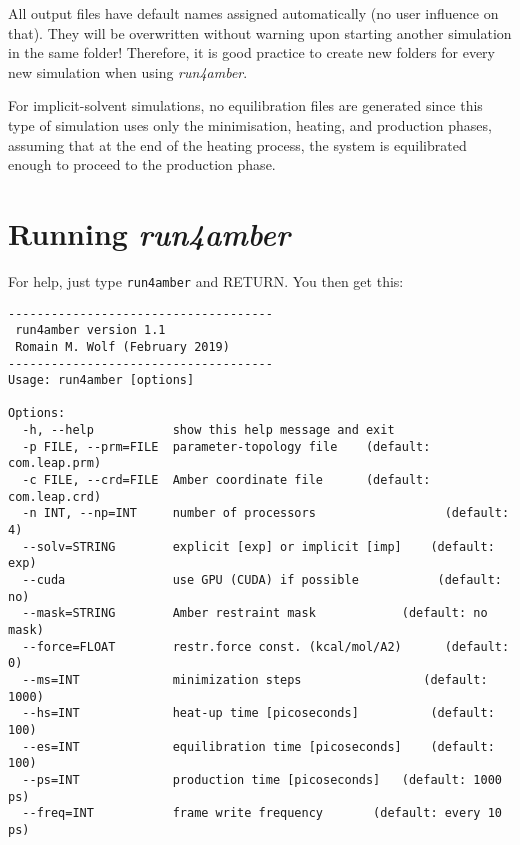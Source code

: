 \documentclass[10pt,landscape,twocolumn]{article}
\begin{document}
\begin{mdframed}All output files have default names assigned automatically (no user influence on that). They will be overwritten without warning upon starting another simulation in the same folder! Therefore, it is good practice to create new folders for every new simulation when using \textsl{run4amber}.\end{mdframed}

\small For implicit-solvent simulations, no equilibration files are generated since this type of simulation uses only the minimisation, heating, and production phases, assuming that at the end of the heating process, the system is equilibrated enough to proceed to the production phase.\normalsize 

\newpage

\section{Running \textsl{run4amber}}

For help, just type \texttt{run4amber} and RETURN. You then get this:

\begin{verbatim}
-------------------------------------
 run4amber version 1.1
 Romain M. Wolf (February 2019)
-------------------------------------
Usage: run4amber [options]

Options:
  -h, --help           show this help message and exit
  -p FILE, --prm=FILE  parameter-topology file    (default: com.leap.prm)
  -c FILE, --crd=FILE  Amber coordinate file      (default: com.leap.crd)
  -n INT, --np=INT     number of processors                  (default: 4)
  --solv=STRING        explicit [exp] or implicit [imp]    (default: exp)
  --cuda               use GPU (CUDA) if possible           (default: no)
  --mask=STRING        Amber restraint mask            (default: no mask)
  --force=FLOAT        restr.force const. (kcal/mol/A2)      (default: 0)
  --ms=INT             minimization steps                 (default: 1000)
  --hs=INT             heat-up time [picoseconds]          (default: 100)
  --es=INT             equilibration time [picoseconds]    (default: 100)
  --ps=INT             production time [picoseconds]   (default: 1000 ps)
  --freq=INT           frame write frequency       (default: every 10 ps)
\end{verbatim}
\end{document}
